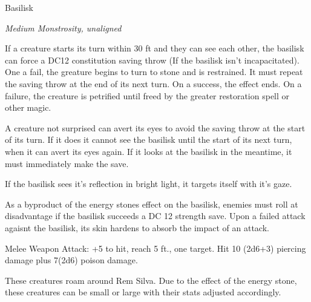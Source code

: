 \documentclass[letterpaper,10pt,twoside,twocolumn,openany]{book}
\begin{document}
\begin{monsterbox}{Basilisk}
	\begin{hangingpar}
		\textit{Medium Monstrosity, unaligned}
	\end{hangingpar}
	\dndline%
	\basics[%
	armorclass = 15,
	hitpoints  = 52,
	speed      = 20 ft
	]
	\dndline%
	\stats[
	STR = \stat{16}, %
	DEX = \stat{8},
	CON = \stat{15},
	INT = \stat{2},
	WIS = \stat{8},
	CHA = \stat{7}
	]
	\dndline%
	\details[%
	senses = {darkvision 60 ft., passive perception 9},
	challenge = 3 (700XP)
	]
	\dndline%
	\begin{monsteraction}
		If a creature starts its turn within 30 ft and they can see each other, the basilisk can force a DC12 constitution saving throw (If the basilisk isn't incapacitated). One a fail, the greature begins to turn to stone and is restrained. It must repeat the saving throw at the end of its next turn. On a success, the effect ends. On a failure,  the creature is petrified until freed by the greater restoration spell or other magic.
		
		A creature not surprised can avert its eyes to avoid the saving throw at the start of its turn. If it does it cannot see the basilisk until the start of its next turn, when it can avert its eyes again. If it looks at the basilisk in the meantime, it must immediately make the save.
		
		If the basilisk sees it's reflection in bright light, it targets itself with it's gaze. 
	\end{monsteraction}	
	\begin{monsteraction}
		As a byproduct of the energy stones effect on the basilisk, enemies must roll at disadvantage if the basilisk succeeds a DC 12 strength save. Upon a failed attack agaisnt the basilisk, its skin hardens to absorb the impact of an attack.
	\end{monsteraction}	
	\begin{monsteraction}[Bite]
		Melee Weapon Attack: +5 to hit, reach 5 ft., one target. Hit 10 (2d6+3) piercing damage plus 7(2d6) poison damage.
	\end{monsteraction}
	These creatures roam around Rem Silva. Due to the effect of the energy stone, these creatures can be small or large with their stats adjusted accordingly. 
\end{monsterbox}
\end{document}
